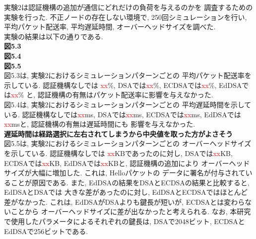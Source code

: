実験2は認証機構の追加が通信にどれだけの負荷を与えるのかを
調査するための実験を行った. 
不正ノードの存在しない環境で, 250回シミュレーションを行い, 
平均パケット配送率, 平均遅延時間, オーバーヘッドサイズを調べた. \\
\indent 実験の結果は以下の通りである. \\

{\LARGE\textbf{図5.3}}\\
{\LARGE\textbf{図5.4}}\\
{\LARGE\textbf{図5.5}}\\

\indent 図5.3は, 実験2におけるシミュレーションパターンごとの
平均パケット配送率を示している. 認証機構なしでは
\textcolor{red}{xx}\%, DSAでは\textcolor{red}{xx}\%, 
ECDSAでは\textcolor{red}{xx}\%, EdDSAでは\textcolor{red}{xx}\%
と, 認証機構の有無はパケット配送率に影響を与えなかった. \\
\indent 図5.4は, 実験2におけるシミュレーションパターンごとの
平均遅延時間を示している. 認証機構なしでは\textcolor{red}{xx}ms, 
DSAでは\textcolor{red}{xx}ms, ECDSAでは\textcolor{red}{xx}ms,
EdDSAでは\textcolor{red}{xx}msと, 認証機構の有無は遅延時間にも
影響を与えなかった. \\
{\LARGE\textbf{遅延時間は経路選択に左右されてしまうから中央値を取った方がよさそう}}\\
\indent 図5.5は, 実験2におけるシミュレーションパターンごとの
オーバーヘッドサイズを示している. 認証機構なしでは
\textcolor{red}{xx}KBであったのに対し, 
DSAでは\textcolor{red}{xx}KB, ECDSAでは\textcolor{red}{xx}KB, 
EdDSAでは\textcolor{red}{xx}KBと, 認証機構の追加により
オーバーヘッドサイズが大幅に増加した. これは, Helloパケットの
データに署名が付与されていることが原因である. また, 
EdDSAの結果をDSAとECDSAの結果と比較すると, EdDSAとDSAでは
大きな差があったのに対し, EdDSAとECDSAではほとんど差がなかった. 
これは, EdDSAがDSAよりも鍵長が短いが, ECDSAとは変わらないことから
オーバーヘッドサイズに差が出なかったと考えられる. 
なお, 本研究で使用したパラメータによるそれぞれの鍵長は, 
DSAで2048ビット, ECDSAとEdDSAで256ビットである. \\


